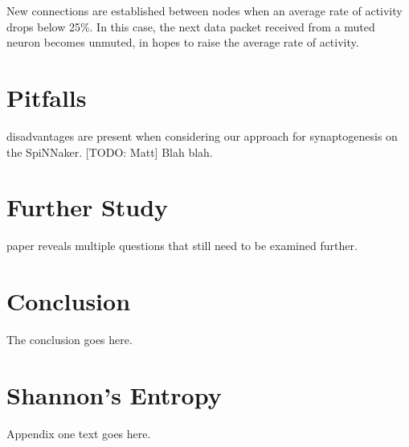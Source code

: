 \documentclass[journal]{./sty/IEEEtran}
\begin{document}
New connections are established between nodes when an average rate of activity drops below 25\%. In this case, the next data packet received from a muted neuron becomes unmuted, in hopes to raise the average rate of activity.

\section{Pitfalls}
 disadvantages are present when considering our approach for synaptogenesis on the SpiNNaker. [TODO: Matt] Blah blah.


\section{Further Study}
 paper reveals multiple questions that still need to be examined further.

\section{Conclusion}
The conclusion goes here.



%


\appendices
\section{Shannon's Entropy}
Appendix one text goes here.
\end{document}
